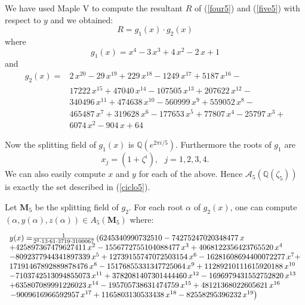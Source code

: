 \documentclass[a4paper,twoside]{article}
\begin{document}
We have used Maple V to compute the resultant $R$ of (\ref{four5}) and (\ref{five5}) with respect
to $y$ and we obtained:
$$R=g_1(x)\cdot g_2(x)$$
where
\begin{equation}\label{g1}
g_1(x)={x}^{4}-3\,{x}^{3}+4\,{x}^{2}-2\,x+1
\end{equation}
and
\begin{equation}\label{g2}
\begin{array}{rl}
g_2(x)=&
2\,{x}^{20}-29\,{x}^{19}+229\,{x}^{18}-1249\,{x}^{17}+5187\,{x}^{16}-\\
&17222\,{x}^{15}+47040\,{x}^{14}-107505\,{x}^{13}+207622\,{x}^{12}-\\
&340496\,{x}^{11}+474638\,{x}^{10}-560999\,{x}^{9}+559052\,{x}^{8}-\\
&465487\,{x}^{7}+319628\,{x}^{6}-177653\,{x}^{5}+77807\,{x}^{4}-25797\,{x}^{3}+\\
&6074\,{x}^{2}-904\,x+64
\end{array}\end{equation}

Now the splitting field of $g_1(x)$ is $\mathbb Q(e^{2\pi i/5})$. Furthermore the roots of
$g_1$ are
$$x_j=(1+\zeta^i),\ \ \ j=1,2,3,4.$$
We can also easily compute  $x$ and $y$ for each of the above.
Hence $\mathcal A_5(\mathbb Q(\zeta_5))$ is exactly the set
described in (\ref{ciclo5}).

Let ${\mathbf M}_5$ be the splitting field of $g_2$. For each root
$\alpha$ of $g_2(x)$, one can compute
$(\alpha,y(\alpha),z(\alpha))\in A_5({\mathbf M}_5)$ where:

\begin{small}
$$\begin{array}{l}\mbox{\normalsize $y(x)=$}
\frac{1}{2^{3}\cdot13\cdot61\cdot3719\cdot3100067}\left(6245340990732510-74275247020348477\,x\right.\\
+425897367479627411\,x^{2}-1556772755104088477\,x^{3}+4068122356423765520\,x^{4}\\
-8092377944341897339\,x^{5}+12739155747072503154\,x^{6}-16281608694400072277\,x^{7}+\\
17191467892889878476\,x^{8}-15176855331347725064\,x^{9}+11289210111615920188\,x^{10}\\
-7103742513094855073\,x^{11}+3782081407301444460\,x^{12}-1696979431552752820\,x^{13}\\
+635807089991226023\,x^{14}-195705738631474759\,x^{15}+48121368022605621\,x^{16}\\
\left.-9009616966592957\,x^{17}+1165803130533438\,x^{18}-82558295396232\,x^{19}\right)
\end{array}
$$
\end{small}
\end{document}

